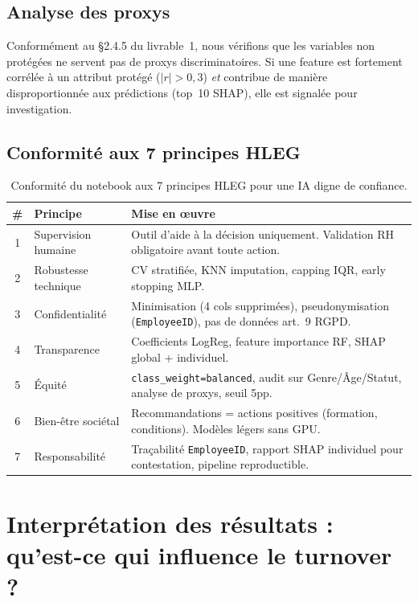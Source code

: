 \documentclass[12pt,a4paper]{article}
\begin{document}
\subsection{Analyse des proxys}

Conformément au §2.4.5 du livrable~1, nous vérifions que les variables non protégées ne servent pas de proxys discriminatoires. Si une feature est fortement corrélée à un attribut protégé ($|r| > 0{,}3$) \textit{et} contribue de manière disproportionnée aux prédictions (top~10 SHAP), elle est signalée pour investigation.

\subsection{Conformité aux 7 principes HLEG}

\begin{table}[ht]
\centering
\small
\begin{tabularx}{\textwidth}{clX}
\toprule
\textbf{\#} & \textbf{Principe} & \textbf{Mise en \oe uvre} \\
\midrule
1 & Supervision humaine & Outil d'aide à la décision uniquement. Validation RH obligatoire avant toute action. \\
2 & Robustesse technique & CV stratifiée, KNN imputation, capping IQR, early stopping MLP. \\
3 & Confidentialité & Minimisation (4 cols supprimées), pseudonymisation (\texttt{EmployeeID}), pas de données art.~9 RGPD. \\
4 & Transparence & Coefficients LogReg, feature importance RF, SHAP global + individuel. \\
5 & Équité & \texttt{class\_weight=balanced}, audit sur Genre/Âge/Statut, analyse de proxys, seuil 5pp. \\
6 & Bien-être sociétal & Recommandations = actions positives (formation, conditions). Modèles légers sans GPU. \\
7 & Responsabilité & Traçabilité \texttt{EmployeeID}, rapport SHAP individuel pour contestation, pipeline reproductible. \\
\bottomrule
\end{tabularx}
\caption{Conformité du notebook aux 7 principes HLEG pour une IA digne de confiance.}
\end{table}

\section{Interprétation des résultats : qu'est-ce qui influence le turnover ?}
\end{document}
